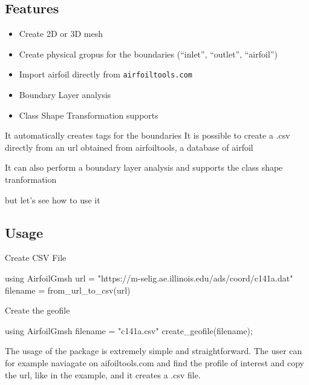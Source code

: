 \documentclass[
  letterpaper,
  DIV=11,
  numbers=noendperiod,
  oneside]{scrartcl}
\newenvironment{Shaded}{\begin{snugshade}}{\end{snugshade}}
\newcommand{\BuiltInTok}[1]{\textcolor[rgb]{0.00,0.23,0.31}{#1}}
\newcommand{\FunctionTok}[1]{\textcolor[rgb]{0.28,0.35,0.67}{#1}}
\newcommand{\ImportTok}[1]{\textcolor[rgb]{0.00,0.46,0.62}{#1}}
\newcommand{\NormalTok}[1]{\textcolor[rgb]{0.00,0.23,0.31}{#1}}
\newcommand{\OperatorTok}[1]{\textcolor[rgb]{0.37,0.37,0.37}{#1}}
\newcommand{\StringTok}[1]{\textcolor[rgb]{0.13,0.47,0.30}{#1}}
\providecommand{\tightlist}{%
  \setlength{\itemsep}{0pt}\setlength{\parskip}{0pt}}\usepackage{longtable,booktabs,array}
\begin{document}
\hypertarget{features-2}{%
\subsection{Features}\label{features-2}}

\begin{itemize}
\tightlist
\item
  Create 2D or 3D mesh
\item
  Create physical gropus for the boundaries (``inlet'', ``outlet'',
  ``airfoil'')
\item
  Import airfoil directly from \texttt{airfoiltools.com}
\item
  Boundary Layer analysis
\item
  Class Shape Transformation supports
\end{itemize}

It automatically creates tags for the boundaries It is possible to
create a .csv directly from an url obtained from airfoiltools, a
database of airfoil

It can also perform a boundary layer analysis and supports the class
shape tranformation

but let's see how to use it

\hypertarget{usage}{%
\subsection{Usage}\label{usage}}

Create CSV File

\begin{Shaded}
\begin{Highlighting}[]
\ImportTok{using} \BuiltInTok{AirfoilGmsh}
\NormalTok{url }\OperatorTok{=} \StringTok{"https://m{-}selig.ae.illinois.edu/ads/coord/c141a.dat"}
\NormalTok{filename }\OperatorTok{=} \FunctionTok{from\_url\_to\_csv}\NormalTok{(url)}
\end{Highlighting}
\end{Shaded}

Create the geofile

\begin{Shaded}
\begin{Highlighting}[]
\ImportTok{using} \BuiltInTok{AirfoilGmsh}
\NormalTok{filename }\OperatorTok{=} \StringTok{"c141a.csv"}
\FunctionTok{create\_geofile}\NormalTok{(filename);}
\end{Highlighting}
\end{Shaded}

The usage of the package is extremely simple and straightforward. The
user can for example naviagate on aifoiltools.com and find the profile
of interest and copy the url, like in the example, and it creates a .csv
file.
\end{document}

